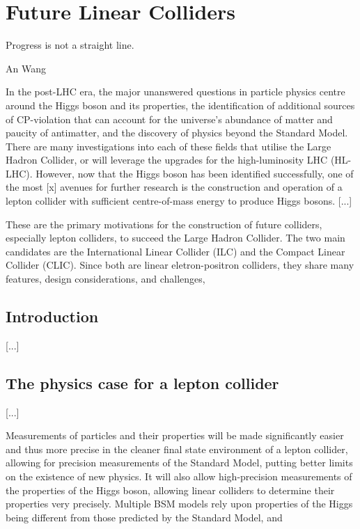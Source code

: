 \chapter{Future Linear Colliders}

\epigraph{Progress is not a straight line.}{An Wang}

In the post-LHC era, the major unanswered questions in particle physics centre around the Higgs boson and its properties, the identification of additional sources of CP-violation that can account for the universe's abundance of matter and paucity of antimatter, and the discovery of physics beyond the Standard Model. There are many investigations into each of these fields that utilise the Large Hadron Collider, or will leverage the upgrades for the high-luminosity LHC (HL-LHC). However, now that the Higgs boson has been identified successfully, one of the most [x] avenues for further research is the construction and operation of a lepton collider with sufficient centre-of-mass energy to produce Higgs bosons. [...]

These are the primary motivations for the construction of future colliders, especially lepton colliders, to succeed the Large Hadron Collider. The two main candidates are the International Linear Collider (ILC) and  the Compact Linear Collider (CLIC). Since both are linear eletron-positron colliders, they share many features, design considerations, and challenges, 

\section{Introduction}
[...]

\section{The physics case for a lepton collider}
[...]

Measurements of particles and their properties will be made significantly easier and thus more precise in the cleaner final state environment of a lepton collider, allowing for precision measurements of the Standard Model, putting better limits on the existence of new physics. It will also allow high-precision measurements of the properties of the Higgs boson, allowing linear colliders to determine their properties very precisely. Multiple BSM models rely upon properties of the Higgs being different from those predicted by the Standard Model, and 


